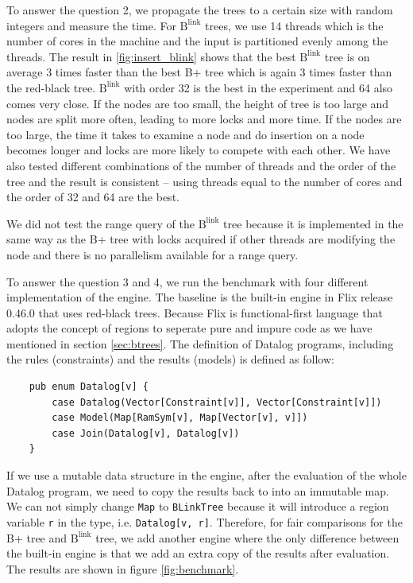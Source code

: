 \documentclass[twoside,11pt]{report}
\theoremstyle{definition}
\begin{document}
To answer the question 2, we propagate the trees to a certain size with random integers and measure the time. For $\text{B}^{\text{link}}$ trees, we use 14 threads which is the number of cores in the machine and the input is partitioned evenly among the threads. The result in \ref{fig:insert_blink} shows that the best $\text{B}^{\text{link}}$ tree is on average 3 times faster than the best B+ tree which is again 3 times faster than the red-black tree. $\text{B}^{\text{link}}$ with order 32 is the best in the experiment and 64 also comes very close. If the nodes are too small, the height of tree is too large and nodes are split more often, leading to more locks and more time. If the nodes are too large, the time it takes to examine a node and do insertion on a node becomes longer and locks are more likely to compete with each other. We have also tested different combinations of the number of threads and the order of the tree and the result is consistent -- using threads equal to the number of cores and the order of 32 and 64 are the best.

We did not test the range query of the $\text{B}^{\text{link}}$ tree because it is implemented in the same way as the B+ tree with locks acquired if other threads are modifying the node and there is no parallelism available for a range query.

To answer the question 3 and 4, we run the benchmark with four different implementation of the engine. The baseline is the built-in engine in Flix release 0.46.0 that uses red-black trees. Because Flix is functional-first language that adopts the concept of regions to seperate pure and impure code as we have mentioned in section \ref{sec:btrees}. The definition of Datalog programs, including the rules (constraints) and the results (models) is defined as follow:
\begin{verbatim}
    pub enum Datalog[v] {
        case Datalog(Vector[Constraint[v]], Vector[Constraint[v]])
        case Model(Map[RamSym[v], Map[Vector[v], v]])
        case Join(Datalog[v], Datalog[v])
    }
\end{verbatim}

If we use a mutable data structure in the engine, after the evaluation of the whole Datalog program, we need to copy the results back to into an immutable map. We can not simply change \texttt{Map} to \texttt{BLinkTree} because it will introduce a region variable \texttt{r} in the type, i.e. \texttt{Datalog[v, r]}. Therefore, for fair comparisons for the B+ tree and $\text{B}^{\text{link}}$ tree, we add another engine where the only difference between the built-in engine is that we add an extra copy of the results after evaluation. The results are shown in figure \ref{fig:benchmark}.
\end{document}
